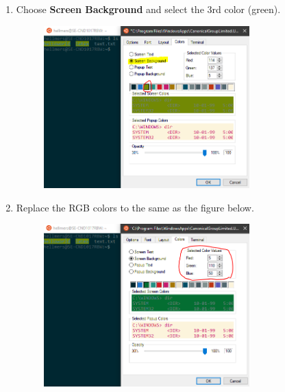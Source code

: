 \begin{enumerate}[a)]
\begin{enumerate}[1.]
        \item Choose \textbf{Screen Background} and select the 3rd color (green).
        \begin{figure}[H]
            \centering
            \includegraphics[width=0.75\textwidth]{tex/WSL/Ubuntu_terminal_colors/Figures/4.PNG}
        \end{figure}
        
        \item Replace the RGB colors to the same as the figure below.
        \begin{figure}[H]
            \centering
            \includegraphics[width=0.75\textwidth]{tex/WSL/Ubuntu_terminal_colors/Figures/5.PNG}
        \end{figure}
        

\end{enumerate}
\end{enumerate}
